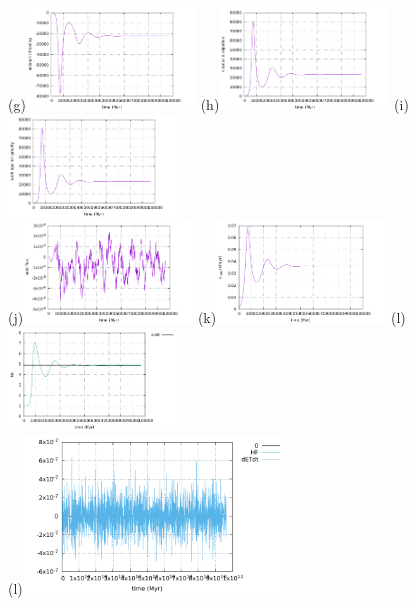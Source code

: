 \begin{center}
(g)\includegraphics[width=4.5cm]{python_codes/fieldstone_compressible2/BA_104/adiabatic_heating}
(h)\includegraphics[width=4.5cm]{python_codes/fieldstone_compressible2/BA_104/viscous_dissipation}
(i)\includegraphics[width=4.5cm]{python_codes/fieldstone_compressible2/BA_104/work_grav}\\
(j)\includegraphics[width=4.5cm]{python_codes/fieldstone_compressible2/BA_104/heat_flux}
(k)\includegraphics[width=4.5cm]{python_codes/fieldstone_compressible2/BA_104/vrms}
(l)\includegraphics[width=4.5cm]{python_codes/fieldstone_compressible2/BA_104/Nu}\\
(l)\includegraphics[width=7cm]{python_codes/fieldstone_compressible2/BA_104/conservation1}

\end{center}
